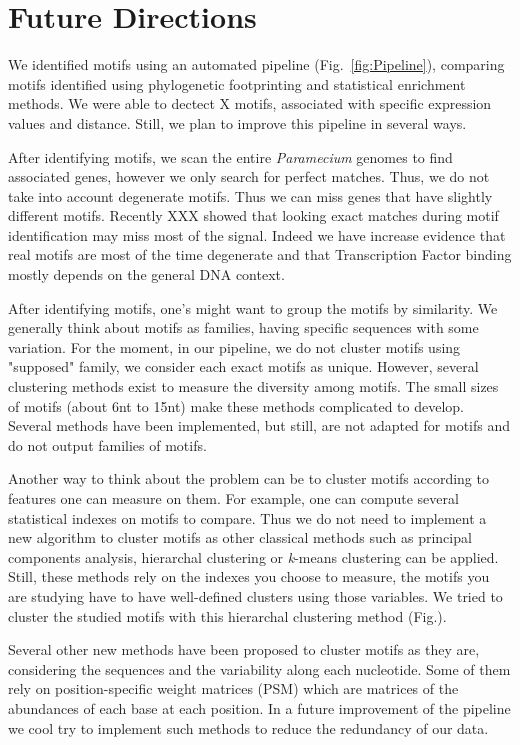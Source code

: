 \section*{Future Directions}
\label{sec:Future}

We identified motifs using an automated pipeline (Fig.~\ref{fig:Pipeline}), comparing motifs identified using phylogenetic footprinting and statistical enrichment methods. We were able to dectect X motifs, associated with specific expression values and distance. Still, we plan to improve this pipeline in several ways.

After identifying motifs, we scan the entire \textit{Paramecium} genomes to find associated genes, however we only search for perfect matches. Thus, we do not take into account degenerate motifs. Thus we can miss genes that have slightly different motifs. Recently XXX showed that looking exact matches during motif identification may miss most of the signal. Indeed we have increase evidence that real motifs are most of the time degenerate and that Transcription Factor binding mostly depends on the general DNA context.

After identifying motifs, one's might want to group the motifs by similarity. We generally think about motifs as families, having specific sequences with some variation. For the moment, in our pipeline, we do not cluster motifs using "supposed" family, we consider each exact motifs as unique. However, several clustering methods exist to measure the diversity among motifs. The small sizes of motifs (about 6nt to 15nt) make these methods complicated to develop. Several methods have been implemented, but still, are not adapted for motifs and do not output families of motifs. 

Another way to think about the problem can be to cluster motifs according to features one can measure on them. For example, one can compute several statistical indexes on motifs to compare. Thus we do not need to implement a new algorithm to cluster motifs as other classical methods such as principal components analysis, hierarchal clustering or \textit{k}-means clustering can be applied. Still, these methods rely on the indexes you choose to measure, the motifs you are studying have to have well-defined clusters using those variables. We tried to cluster the studied motifs with this hierarchal clustering method (Fig.).

Several other new methods have been proposed to cluster motifs as they are, considering the sequences and the variability along each nucleotide. Some of them rely on position-specific weight matrices (PSM) which are matrices of the abundances of each base at each position. In a future improvement of the pipeline we cool try to implement such methods to reduce the redundancy of our data.

